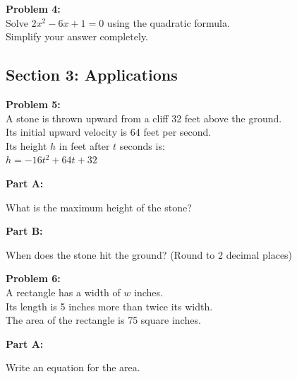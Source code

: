 \documentclass[12pt]{article}
\begin{document}
			\vspace{6cm}

			\textbf{Problem 4:}\\

			Solve $2x^2 - 6x + 1 = 0$ using the quadratic formula.\\

			Simplify your answer completely.

			\newpage

		\subsection*{Section 3: Applications}

			\textbf{Problem 5:}\\

			A stone is thrown upward from a cliff 32 feet above the ground.\\

			Its initial upward velocity is 64 feet per second.\\

			Its height $h$ in feet after $t$ seconds is:\\

			$h = -16t^2 + 64t + 32$

			\vspace{0.5cm}

			\textbf{Part A:}
            
            What is the maximum height of the stone?

			\vspace{5cm}

			\textbf{Part B:}
            
            When does the stone hit the ground? (Round to 2 decimal places)

			\newpage

			\textbf{Problem 6:}\\

			A rectangle has a width of $w$ inches.\\

			Its length is 5 inches more than twice its width.\\

			The area of the rectangle is 75 square inches.

			\vspace{0.5cm}

			\textbf{Part A:}
            
            Write an equation for the area.
\end{document}

